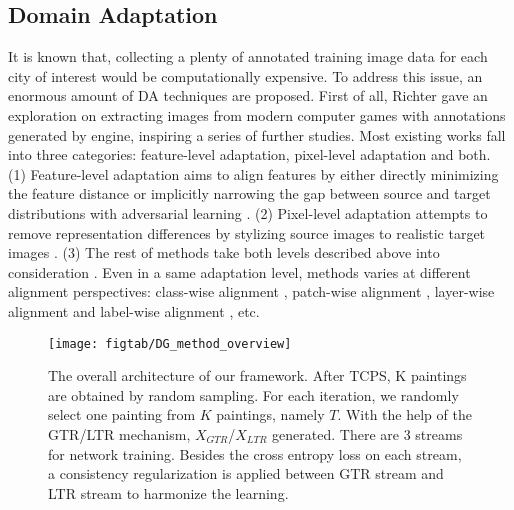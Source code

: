 \documentclass[twocolumn,journal,vlined,ruled,linesnumbered]{IEEEtran}
\begin{document}
\subsection{Domain Adaptation\label{subsec:Domain-Adaption}}

It is known that, collecting a plenty of annotated training image data for each city of interest would be computationally expensive. To address this issue, an enormous amount of DA techniques are proposed. First of all, Richter \cite{richter2016playing} gave an exploration on extracting images from modern computer games with annotations generated by engine, inspiring a series of further studies. Most existing works fall into three categories: feature-level adaptation, pixel-level adaptation and both. (1) Feature-level adaptation aims to align features by either directly minimizing the feature distance \cite{chen2018road,long2016unsupervised,ganin2014unsupervised,cariucci2017autodial} or implicitly narrowing the gap between source and target distributions with adversarial learning \cite{hoffman2016fcns,chen2017no,tsai2018learning,tzeng2017adversarial,luo2019taking,vu2019advent,tsai2019domain}. (2) Pixel-level adaptation attempts to remove representation differences by stylizing source images to realistic target images \cite{zhu2017unpaired,murez2018image,bousmalis2017unsupervised,zou2018domain}. (3) The rest of methods take both levels described above into consideration \cite{hoffman2017cycada,wu2018dcan}. Even in a same adaptation level, methods varies at different alignment perspectives: class-wise alignment \cite{chen2017no,du2019ssf,luo2019taking}, patch-wise alignment \cite{tsai2019domain}, layer-wise alignment \cite{long2016unsupervised,cariucci2017autodial} and label-wise alignment \cite{tsai2018learning,zou2018domain}, etc.

\begin{figure*}[tbh]
\begin{centering}
\texttt{[image: figtab/DG\_method\_overview]}
\par\end{centering}
\vspace{-2mm}
\caption{The overall architecture of our framework. After TCPS, K paintings are obtained by random sampling. For each iteration, we randomly select one painting from $K$ paintings, namely $T$. With the help of the GTR/LTR mechanism, $X_{GTR}$/$X_{LTR}$ generated. There are 3 streams for network training. Besides the cross entropy loss on each stream, a consistency regularization is applied between GTR stream and LTR stream to harmonize the learning. \label{fig:Overview-of-the}}
\vspace{-5mm}
\end{figure*}
\end{document}
